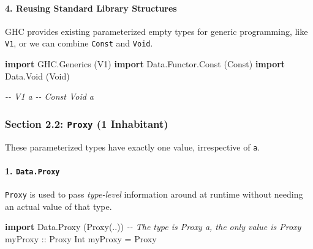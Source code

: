 \documentclass[
]{article}
\newenvironment{Shaded}{}{}
\newcommand{\CommentTok}[1]{\textcolor[rgb]{0.38,0.63,0.69}{\textit{#1}}}
\newcommand{\DataTypeTok}[1]{\textcolor[rgb]{0.56,0.13,0.00}{#1}}
\newcommand{\KeywordTok}[1]{\textcolor[rgb]{0.00,0.44,0.13}{\textbf{#1}}}
\newcommand{\NormalTok}[1]{#1}
\newcommand{\OtherTok}[1]{\textcolor[rgb]{0.00,0.44,0.13}{#1}}
\begin{document}
\paragraph{4. Reusing Standard Library
Structures}\label{reusing-standard-library-structures}

GHC provides existing parameterized empty types for generic programming,
like \texttt{V1}, or we can combine \texttt{Const} and \texttt{Void}.

\begin{Shaded}
\begin{Highlighting}[]
\KeywordTok{import} \DataTypeTok{GHC.Generics}\NormalTok{ (}\DataTypeTok{V1}\NormalTok{)}
\KeywordTok{import} \DataTypeTok{Data.Functor.Const}\NormalTok{ (}\DataTypeTok{Const}\NormalTok{)}
\KeywordTok{import} \DataTypeTok{Data.Void}\NormalTok{ (}\DataTypeTok{Void}\NormalTok{)}

\CommentTok{{-}{-} V1 a }
\CommentTok{{-}{-} Const Void a}
\end{Highlighting}
\end{Shaded}

\subsubsection{\texorpdfstring{Section 2.2: \texttt{Proxy} (1
Inhabitant)}{Section 2.2: Proxy (1 Inhabitant)}}\label{section-2.2-proxy-1-inhabitant}

These parameterized types have exactly one value, irrespective of
\texttt{a}.

\paragraph{\texorpdfstring{1.
\texttt{Data.Proxy}}{1. Data.Proxy}}\label{data.proxy}

\texttt{Proxy} is used to pass \emph{type-level} information around at
runtime without needing an actual value of that type.

\begin{Shaded}
\begin{Highlighting}[]
\KeywordTok{import} \DataTypeTok{Data.Proxy}\NormalTok{ (}\DataTypeTok{Proxy}\NormalTok{(..))}
\CommentTok{{-}{-} The type is \textasciigrave{}Proxy a\textasciigrave{}, the only value is \textasciigrave{}Proxy\textasciigrave{}}
\OtherTok{myProxy ::} \DataTypeTok{Proxy} \DataTypeTok{Int}
\NormalTok{myProxy }\OtherTok{=} \DataTypeTok{Proxy}
\end{Highlighting}
\end{Shaded}
\end{document}
